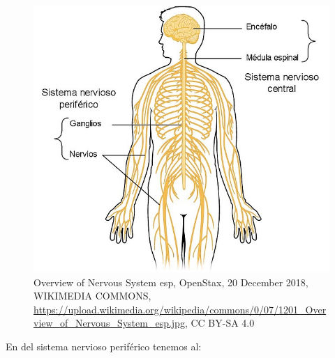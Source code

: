 \begin{figure}[h]
 \centering
 \includegraphics[scale=0.5]{../Figuras/Nervous_System.jpg}
 \caption{Overview of Nervous System esp, OpenStax, 20 December 2018, WIKIMEDIA COMMONS, \url{https://upload.wikimedia.org/wikipedia/commons/0/07/1201_Overview_of_Nervous_System_esp.jpg}, CC BY-SA 4.0}
 \label{fig:SNCySNP}
\end{figure}

En del sistema nervioso periférico tenemos al:

